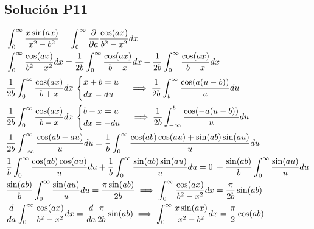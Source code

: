 \begin{CajaTitulo}{\begin{center}\subsection{Solución P11}\end{center}}
    \vspace{0.5cm}
    \begin{align*}
    & \int_{0}^{\infty}\frac{x\sin(ax)}{x^2 - b^2}  =  \int_{0}^{\infty} \frac{\partial}{\partial a} \frac{\cos(ax)}{b^2 - x^2}dx \\
    & \int_{0}^{\infty}\frac{\cos(ax)}{b^2 - x^2}dx = \frac{1}{2b}\int_{0}^{\infty}\frac{\cos(ax)}{b + x}dx - \frac{1}{2b}\int_{0}^{\infty}\frac{\cos(ax)}{b - x}dx \\
    & \frac{1}{2b}\int_{0}^{\infty}\frac{\cos(ax)}{b + x}dx \: \begin{cases} x+b = u \\ dx = du \end{cases}  \implies \frac{1}{2b}\int_{b}^{\infty}\frac{\cos(a(u-b))}{u}du \\
    & \frac{1}{2b}\int_{0}^{\infty}\frac{\cos(ax)}{b - x}dx \: \begin{cases} b - x = u \\ dx = -du \end{cases}  \implies \frac{1}{2b}\int_{-\infty}^{b}\frac{\cos(-a(u-b))}{u}du \\
& \frac{1}{2b}\int_{-\infty}^{\infty}\frac{\cos(ab - au)}{u}du = \frac{1}{b}\int_{0}^{\infty}\frac{\cos(ab)\cos(au) + \sin(ab)\sin(au)}{u}du \\
& \frac{1}{b}\int_{0}^{\infty}\frac{\cos(ab)\cos(au)}{u}du  + \frac{1}{b}\int_{0}^{\infty}\frac{\sin(ab)\sin(au)}{u}du = 0 \: + \frac{\sin(ab)}{b}\int_{0}^{\infty}\frac{\sin(au)}{u}du \\
& \frac{\sin(ab)}{b}\int_{0}^{\infty}\frac{\sin(au)}{u}du = \frac{\pi\sin(ab)}{2b} \implies \int_{0}^{\infty}\frac{\cos(ax)}{b^2-x^2}dx = \frac{\pi}{2b}\sin(ab) \\
& \frac{d}{da} \int_{0}^{\infty}\frac{\cos(ax)}{b^2-x^2}dx =  \frac{d}{da} \frac{\pi}{2b}\sin(ab) \implies \int_{0}^{\infty} \frac{x\sin(ax)}{x^2 - b^2}dx =  \frac{\pi}{2}\cos(ab) \\
\end{align*}
\end{CajaTitulo}